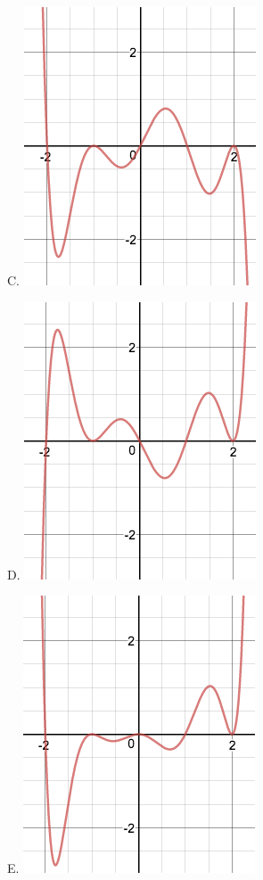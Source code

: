 \documentclass{ximera}
\begin{document}
\begin{question}
\begin{center}
\begin{expandable}
\begin{expandable}
\begin{multicols}{3}
\begin{center}
C. \includegraphics[scale=0.25]{Graph3}
\end{center}
\end{multicols}

\begin{multicols}{3}
\begin{center}
D. \includegraphics[scale=0.25]{Graph4}
\end{center}

\begin{center}
E. \includegraphics[scale=0.25]{Graph5} %
\end{center}


\end{multicols}
\end{expandable}
\end{expandable}
\end{center}
\end{question}
\end{document}
